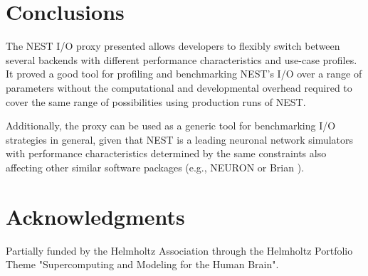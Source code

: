\documentclass[]{YIC2015}
\begin{document}

\section{Conclusions}

The NEST I/O proxy presented allows developers to flexibly switch
between several backends with different performance characteristics
and use-case profiles. It proved a good tool for profiling and
benchmarking NEST's I/O over a range of parameters without the
computational and developmental overhead required to cover the same
range of possibilities using production runs of NEST.

Additionally, the proxy can be used as a generic tool for benchmarking
I/O strategies in general, given that NEST is a leading neuronal
network simulators with performance characteristics determined by the
same constraints also affecting other similar software packages (e.g.,
NEURON \cite{neuron} or Brian \cite{brian}).

\section*{Acknowledgments}

Partially funded by the Helmholtz Association through the Helmholtz
Portfolio Theme "Supercomputing and Modeling for the Human Brain".
\end{document}
